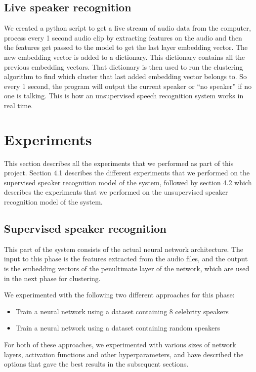 \documentclass[10pt,twocolumn,letterpaper]{article}
\begin{document}
\subsection{Live speaker recognition}

We created a python script to get a live stream of audio data from the computer, process every 1 second audio clip by extracting features on the audio and then the features get passed to the model to get the last layer embedding vector. The new embedding vector is added to a dictionary. This dictionary contains all the previous embedding vectors. That dictionary is then used to run the clustering algorithm to find which cluster that last added embedding vector belongs to. So every 1 second, the program will output the current speaker or “no speaker” if no one is talking. This is how an unsupervised speech recognition system works in real time.


\section{Experiments}
This section describes all the experiments that we performed as part of this project. Section 4.1 describes the different experiments that we performed on the supervised speaker recognition model of the system, followed by section 4.2 which describes the experiments that we performed on the unsupervised speaker recognition model of the system.
\subsection{Supervised speaker recognition}
This part of the system consists of the actual neural network architecture. The input to this phase is the features extracted from the audio files, and the output is the embedding vectors of the penultimate layer of the network, which are used in the next phase for clustering.

We experimented with the following two different approaches for this phase:
\begin{itemize}
    \item Train a neural network using a dataset containing 8 celebrity speakers
    \item Train a neural network using a dataset containing random speakers
\end{itemize}
For both of these approaches, we experimented with various sizes of network layers, activation functions and other hyperparameters, and have described the options that gave the best results in the subsequent sections.
\end{document}
